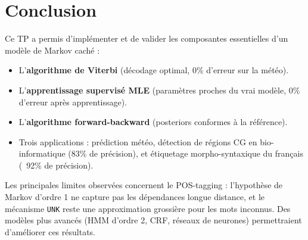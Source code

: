 \documentclass[12pt,a4paper]{article}
\begin{document}
\section*{Conclusion}

Ce TP a permis d'implémenter et de valider les composantes essentielles d'un modèle
de Markov caché :

\begin{itemize}
  \item L'\textbf{algorithme de Viterbi} (décodage optimal, 0\% d'erreur sur la météo).
  \item L'\textbf{apprentissage supervisé MLE} (paramètres proches du vrai modèle,
        0\% d'erreur après apprentissage).
  \item L'\textbf{algorithme forward-backward} (posteriors conformes à la référence).
  \item Trois applications : prédiction météo, détection de régions CG en bio-informatique
        (83\% de précision), et étiquetage morpho-syntaxique du français (~92\% de précision).
\end{itemize}

Les principales limites observées concernent le POS-tagging : l'hypothèse de Markov
d'ordre 1 ne capture pas les dépendances longue distance, et le mécanisme \texttt{UNK}
reste une approximation grossière pour les mots inconnus. Des modèles plus avancés
(HMM d'ordre 2, CRF, réseaux de neurones) permettraient d'améliorer ces résultats.
\end{document}
